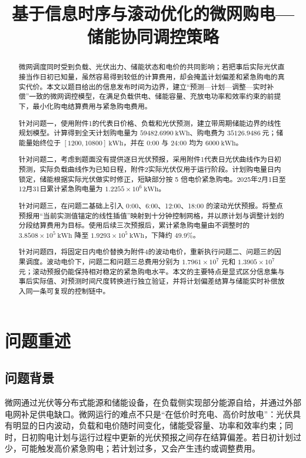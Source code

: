 \documentclass[withoutpreface]{cumcmthesis}
\title{基于信息时序与滚动优化的微网购电—储能协同调控策略}
\begin{document}
\maketitle

\begin{abstract}
微网调度同时受到负载、光伏出力、储能状态和电价的共同影响；若把事后实际光伏直接当作日初已知量，虽然容易得到较低的计算费用，却会掩盖计划偏差和紧急购电的真实代价。本文以题目给出的信息发布时间为边界，建立“预测—计划—调整—实时补偿”一致的微网调控模型，在满足负载供电、储能容量、充放电功率和效率约束的前提下，最小化购电结算费用与紧急购电费用。

针对问题一，使用附件1的代表日价格、负载和光伏预测，建立带周期储能边界的线性规划模型。计算得到全天计划购电量为 $59482.6990\ \mathrm{kWh}$、购电费为 $35126.9486\ \mathrm{元}$；储能量始终位于 $[1200,10800]\ \mathrm{kWh}$，并在 0:00 与 24:00 均为 $6000\ \mathrm{kWh}$。

针对问题二，考虑到题面没有提供逐日光伏预报，采用附件1代表日光伏曲线作为日初预测，实际负载曲线作为已知日程，附件2实际光伏仅用于运行阶段。计划购电量日内锁定，储能根据实际光伏做实时修正，短缺部分按 5 倍电价紧急购电。2025年2月1日至12月31日累计紧急购电量为 $1.2255\times10^6\ \mathrm{kWh}$。

针对问题三，在问题二基础上引入 0:00、6:00、12:00、18:00 的滚动光伏预报。将整点预报用“当前实测值锚定的线性插值”映射到十分钟控制网格，并以原计划与调整计划的分段结算费用为目标。使用后续三次预报后，累计紧急购电量由不调整时的 $3.8508\times10^5\ \mathrm{kWh}$ 降至 $1.9293\times10^5\ \mathrm{kWh}$，下降约 $49.9\%$。

针对问题四，将固定日内电价替换为附件4的波动电价，重新执行问题二、问题三的因果调度。波动电价下，问题二和问题三总费用分别为 $1.7961\times10^7$ 元和 $1.3905\times10^7$ 元；滚动预报仍能保持相对稳定的紧急购电水平。本文的主要特点是显式区分信息集与事后实际值、对预测时间尺度转换进行独立验证，并将计划偏差结算与储能实时补偿放入同一条可复现的控制链中。

\end{abstract}
\newpage

\section{问题重述}
\subsection{问题背景}
微网通过光伏等分布式能源和储能设备，在负载侧实现部分能源自给，并通过外部电网补足供电缺口。微网运行的难点不只是“在低价时充电、高价时放电”：光伏具有明显的日内波动，负载和电价随时间变化，储能受容量、功率和效率约束；同时，日初购电计划与运行过程中更新的光伏预报之间存在结算偏差。若日初计划过少，可能触发高价紧急购电；若计划过多，又会产生违约或调整费用。
\end{document}
